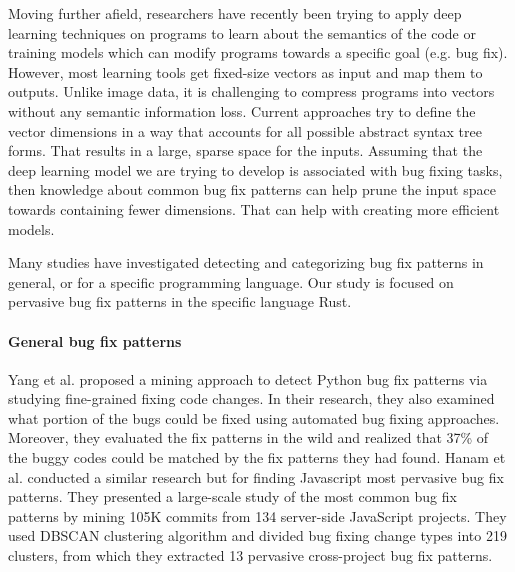 Moving further afield, researchers have recently been trying to apply deep learning techniques on programs to learn about the semantics of the code or training models which can modify programs towards a specific goal (e.g. bug fix). However, most learning tools get fixed-size vectors as input and map them to outputs. Unlike image data, it is challenging to compress programs into vectors without any semantic information loss. Current approaches try to define the vector dimensions in a way that accounts for all possible abstract syntax tree forms. That results in a large, sparse space for the inputs. Assuming that the deep learning model we are trying to develop is associated with bug fixing tasks, then knowledge about common bug fix patterns can help prune the input space towards containing fewer dimensions. That can help with creating more efficient models.

Many studies have investigated detecting and categorizing bug fix patterns in general, or for a specific programming language. Our study is focused on pervasive bug fix patterns in the specific language Rust. 

\paragraph{General bug fix patterns}
Yang et al. proposed a mining approach to detect Python bug fix patterns via studying
fine-grained fixing code changes. In their research, they also examined what portion of the bugs
could be fixed using automated bug fixing approaches. Moreover, they evaluated the fix patterns in
the wild and realized that 37\% of the buggy codes could be matched by the fix patterns they had
found.
Hanam et al. conducted a similar research but for finding Javascript most pervasive bug fix
patterns. They presented a large-scale study of the most common bug fix patterns by mining 105K
commits from 134 server-side JavaScript projects. They used DBSCAN clustering algorithm
and divided bug fixing change types into 219 clusters, from which they extracted 13 pervasive
cross-project bug fix patterns.

